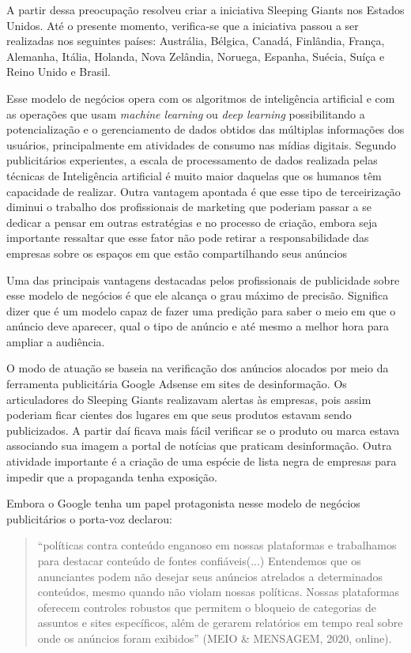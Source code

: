 A partir dessa preocupação resolveu criar a iniciativa Sleeping Giants
nos Estados Unidos. Até o presente momento, verifica-se que a iniciativa
passou a ser realizadas nos seguintes países: Austrália, Bélgica,
Canadá, Finlândia, França, Alemanha, Itália, Holanda, Nova Zelândia,
Noruega, Espanha, Suécia, Suíça e Reino Unido e Brasil.

Esse modelo de negócios opera com os algoritmos de inteligência
artificial e com as operações que usam \emph{machine learning} ou
\emph{deep learning} possibilitando a potencialização e o gerenciamento
de dados obtidos das múltiplas informações dos usuários, principalmente
em atividades de consumo nas mídias digitais. Segundo publicitários
experientes, a escala de processamento de dados realizada pelas técnicas
de Inteligência artificial é muito maior daquelas que os humanos têm
capacidade de realizar. Outra vantagem apontada é que esse tipo de
terceirização diminui o trabalho dos profissionais de marketing que
poderiam passar a se dedicar a pensar em outras estratégias e no
processo de criação, embora seja importante ressaltar que esse fator não
pode retirar a responsabilidade das empresas sobre os espaços em que
estão compartilhando seus anúncios

Uma das principais vantagens destacadas pelos profissionais de
publicidade sobre esse modelo de negócios é que ele alcança o grau
máximo de precisão. Significa dizer que é um modelo capaz de fazer uma
predição para saber o meio em que o anúncio deve aparecer, qual o tipo
de anúncio e até mesmo a melhor hora para ampliar a audiência.

O modo de atuação se baseia na verificação dos anúncios alocados por
meio da ferramenta publicitária Google Adsense em sites de
desinformação. Os articuladores do Sleeping Giants realizavam alertas às
empresas, pois assim poderiam ficar cientes dos lugares em que seus
produtos estavam sendo publicizados. A partir daí ficava mais fácil
verificar se o produto ou marca estava associando sua imagem a portal de
notícias que praticam desinformação. Outra atividade importante é a
criação de uma espécie de lista negra de empresas para impedir que a
propaganda tenha exposição.

Embora o Google tenha um papel protagonista nesse modelo de negócios
publicitários o porta-voz declarou:

\begin{quote}
``políticas contra conteúdo enganoso em nossas plataformas e trabalhamos
para destacar conteúdo de fontes confiáveis(...) Entendemos que os
anunciantes podem não desejar seus anúncios atrelados a determinados
conteúdos, mesmo quando não violam nossas políticas. Nossas plataformas
oferecem controles robustos que permitem o bloqueio de categorias de
assuntos e sites específicos, além de gerarem relatórios em tempo real
sobre onde os anúncios foram exibidos'' (MEIO \& MENSAGEM, 2020,
online).
\end{quote}


